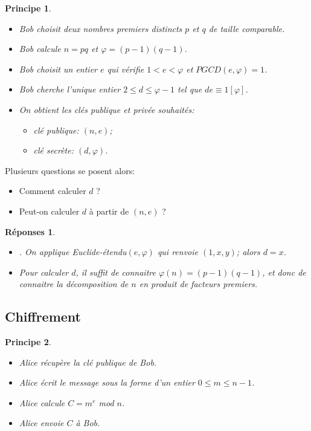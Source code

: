 \documentclass[10pt,a4paper]{report}
\newtheorem*{reps}{Réponses}
\newtheorem*{prin}{Principe}
\begin{document}
\begin{prin}\
\begin{itemize}
\item[•] Bob choisit deux nombres premiers distincts $p$ et $q$ de taille comparable.
\item[•] Bob calcule $n=pq$ et $\varphi=(p-1)(q-1)$.
\item[•] Bob choisit un entier $e$ qui vérifie $1<e< \varphi$ et $PGCD(e,\varphi)=1$.
\item[•] Bob cherche l'unique entier $2 \leqslant d \leqslant \varphi -1$ tel que $de \equiv 1 [\varphi]$.
\item[•] On obtient les clés publique et privée souhaités:
\begin{itemize}
\item[$\star$] clé publique: $(n,e)$;
\item[$\star$] clé secrète: $(d,\varphi)$.
\end{itemize}  
\end{itemize}
\end{prin}

Plusieurs questions se posent alors:
\begin{itemize}
\item[$1)$] Comment calculer $d$ ?
\item[$2)$] Peut-on calculer $d$ à partir de $(n,e)$ ?
\end{itemize}

\begin{reps}
\begin{itemize}
\item[$1)$] . On applique Euclide-étendu$(e,\varphi)$ qui renvoie $(1,x,y)$; alors $d=x$.
\item[$2)$] Pour calculer $d$, il suffit de connaitre $\varphi(n)=(p-1)(q-1)$, et donc de connaitre la décomposition de $n$ en produit de facteurs premiers.
\end{itemize}
\end{reps}

\subsection{Chiffrement}

\begin{prin}\
\begin{itemize}
\item[•] Alice récupère la clé publique de Bob.
\item[•] Alice écrit le message sous la forme d'un entier $0 \leqslant m \leqslant n-1$.
\item[•] Alice calcule $C=m^e$ mod $n$.
\item[•] Alice envoie $C$ à Bob.
\end{itemize}
\end{prin}
\end{document}
